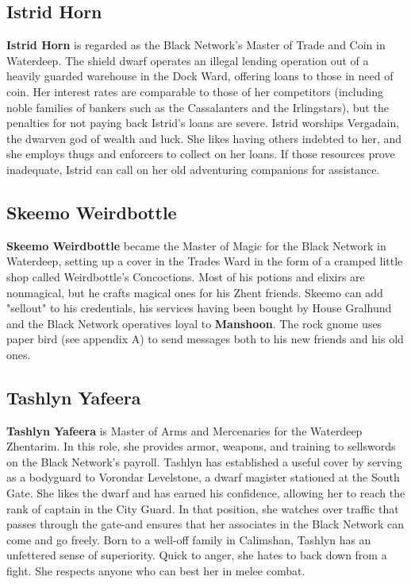 \documentclass[10pt,a4paper,twoside,twocolumn,openany,nodeprecatedcode]{dndbook}
\begin{document}
\subsection{Istrid Horn}
\textbf{Istrid Horn} is regarded as the Black Network's Master of Trade and Coin in Waterdeep. The shield dwarf operates an illegal lending operation out of a heavily guarded warehouse in the Dock Ward, offering loans to those in need of coin. Her interest rates are comparable to those of her competitors (including noble families of bankers such as the Cassalanters and the Irlingstars), but the penalties for not paying back Istrid's loans are severe.
Istrid worships Vergadain, the dwarven god of wealth and luck. She likes having others indebted to her, and she employs thugs and enforcers to collect on her loans. If those resources prove inadequate, Istrid can call on her old adventuring companions for assistance.
\subsection{Skeemo Weirdbottle}
\textbf{Skeemo Weirdbottle} became the Master of Magic for the Black Network in Waterdeep, setting up a cover in the Trades Ward in the form of a cramped little shop called Weirdbottle's Concoctions. Most of his potions and elixirs are nonmagical, but he crafts magical ones for his Zhent friends.
Skeemo can add "sellout" to his credentials, his services having been bought by House Gralhund and the Black Network operatives loyal to \textbf{Manshoon}. The rock gnome uses paper bird (see appendix A) to send messages both to his new friends and his old ones.
\subsection{Tashlyn Yafeera}
\textbf{Tashlyn Yafeera} is Master of Arms and Mercenaries for the Waterdeep Zhentarim. In this role, she provides armor, weapons, and training to sellswords on the Black Network's payroll.
Tashlyn has established a useful cover by serving as a bodyguard to Vorondar Levelstone, a dwarf magister stationed at the South Gate. She likes the dwarf and has earned his confidence, allowing her to reach the rank of captain in the City Guard. In that position, she watches over traffic that passes through the gate-and ensures that her associates in the Black Network can come and go freely.
Born to a well-off family in Calimshan, Tashlyn has an unfettered sense of superiority. Quick to anger, she hates to back down from a fight. She respects anyone who can best her in melee combat.
\end{document}
